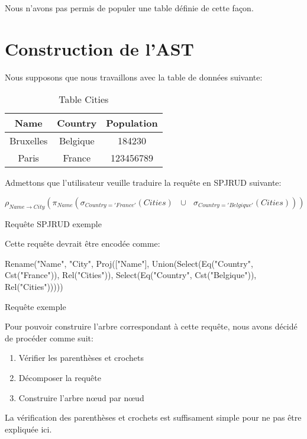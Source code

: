\documentclass[]{article}
\begin{document}
Nous n'avons pas permis de populer une table d\'efinie de cette fa\c{c}on.

\section{Construction de l'AST}

Nous supposons que nous travaillons avec la table de donn\'ees suivante:

\begin{table}[H]
	\centering
	\begin{tabular}{| c | c | c |}
		\hline
		\textbf{Name} & \textbf{Country} & \textbf{Population} \\
		\hline
		Bruxelles & Belgique & 184230\\
		\hline
		Paris & France & 123456789\\
		\hline
	\end{tabular}
	\caption{Table Cities}
	\label{Cities}
\end{table}

Admettons que l'utilisateur veuille traduire la requ\^ete en SPJRUD suivante:

\begin{request}[H]
	\centering
	$\rho_{Name \to City}(\pi_{Name}(\sigma_{Country='France'}(Cities) \text{ } \cup \text{ } \sigma_{Country='Belgique'}(Cities)))$
	\caption{Requ\^ete SPJRUD exemple}
\end{request}

Cette requ\^ete devrait \^etre encod\'ee comme:

\begin{request}[H]
	\centering
		Rename("Name", "City", Proj(["Name"], Union(Select(Eq("Country", Cst("France")), Rel("Cities")), Select(Eq("Country", Cst("Belgique")), Rel("Cities")))))
	\caption{Requ\^ete exemple}
	\label{exemple}
\end{request}

Pour pouvoir construire l'arbre correspondant \`a cette requ\^ete, nous avons d\'ecid\'e de proc\'eder comme suit:

\begin{enumerate}
	\item V\'erifier les parenth\`eses et crochets
	\item D\'ecomposer la requ\^ete
	\item Construire l'arbre n\oe{}ud par n\oe{}ud
\end{enumerate}

La v\'erification des parenth\`eses et crochets est suffisament simple pour ne pas \^etre expliqu\'ee ici.
\end{document}
